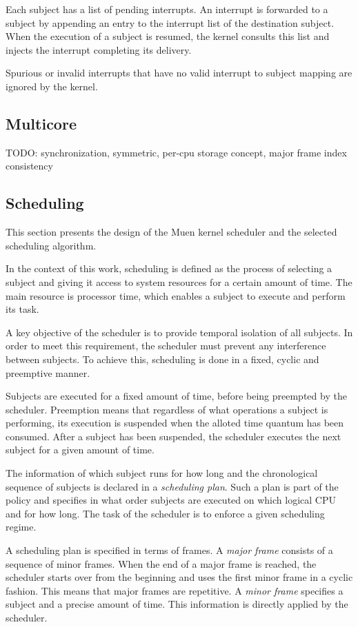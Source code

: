 Each subject has a list of pending interrupts. An interrupt is forwarded to a
subject by appending an entry to the interrupt list of the destination subject.
When the execution of a subject is resumed, the kernel consults this list and
injects the interrupt completing its delivery.

Spurious or invalid interrupts that have no valid interrupt to subject mapping
are ignored by the kernel.

\subsection{Multicore}\label{subsec:multicore}
TODO: synchronization, symmetric, per-cpu storage concept, major frame index
consistency

\subsection{Scheduling}\label{subsec:scheduling}
This section presents the design of the Muen kernel scheduler and the selected
scheduling algorithm.

In the context of this work, scheduling is defined as the process of selecting
a subject and giving it access to system resources for a certain amount of time.
The main resource is processor time, which enables a subject to execute and
perform its task.

A key objective of the scheduler is to provide temporal isolation of all
subjects. In order to meet this requirement, the scheduler must prevent any
interference between subjects. To achieve this, scheduling is done in a fixed,
cyclic and preemptive manner.

Subjects are executed for a fixed amount of time, before being preempted by the
scheduler. Preemption means that regardless of what operations a subject is
performing, its execution is suspended when the alloted time quantum has been
consumed. After a subject has been suspended, the scheduler executes the next
subject for a given amount of time.

The information of which subject runs for how long and the chronological
sequence of subjects is declared in a \emph{scheduling plan}.  Such a plan is part of the policy and specifies in what order subjects
are executed on which logical CPU and for how long. The task of the scheduler is
to enforce a given scheduling regime.

A scheduling plan is specified in terms of frames. A \emph{major frame}
 consists of a sequence of minor frames. When the end of a
major frame is reached, the scheduler starts over from the beginning and uses
the first minor frame in a cyclic fashion. This means that major frames are
repetitive. A \emph{minor frame} specifies a subject and a
precise amount of time. This information is directly applied by the scheduler.

